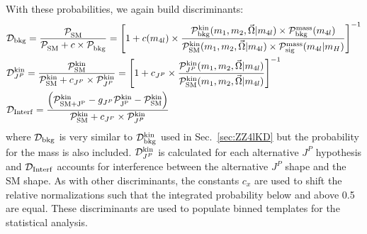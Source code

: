 With these probabilities, we again build discriminants:
\begin{align}
& {\mathcal{D}}_{\rm bkg} = \frac{{\mathcal{P}}^{\rm }_{\rm SM} }{{\mathcal{P}}^{\rm }_{\rm SM} +c\times{\mathcal{P}}^{\rm }_{\rm bkg} }=
\left[1+c(m_{4l})\times\frac{{\mathcal{P}}^{\rm kin}_{\rm bkg} (m_1, m_2, \vec\Omega | m_{4l})\times {\mathcal{P}}^{\rm mass}_{\rm bkg} (m_{4l})  }
{{\mathcal{P}}^{\rm kin}_{\rm SM} (m_1, m_2, \vec\Omega | m_{4l}) \times {\mathcal{P}}^{\rm mass}_{\rm sig} (m_{4l}|m_H) } \right]^{-1} \nonumber \\
& {\mathcal{D}}^{\rm kin}_{J^P} = \frac{{\mathcal{P}}^{\rm kin}_{\rm SM} }{{\mathcal{P}}^{\rm kin}_{\rm SM} +c_{J^P}\times{\mathcal{P}}^{\rm kin}_{J^P} }=
\left[1+c_{J^P}\times\frac{{\mathcal{P}}^{\rm kin}_{J^P} (m_1, m_2, \vec\Omega | m_{4l}) }
{{\mathcal{P}}^{\rm kin}_{\rm SM} (m_1, m_2, \vec\Omega | m_{4l}) } \right]^{-1} \nonumber \\
& {\mathcal{D}}_{\rm Interf} = \frac{ \left({\mathcal{P}}^{\rm kin}_{\rm SM + J^P} - g_{J^P}{\mathcal{P}}^{\rm kin}_{\rm J^P} - {\mathcal{P}}^{\rm kin}_{\rm SM}\right)}{{\mathcal{P}}^{\rm kin}_{\rm SM} +c_{J^P}\times{\mathcal{P}}^{\rm kin}_{J^P} } \nonumber
\end{align}
where ${\mathcal{D}}_{\rm bkg}$ is very similar to ${\mathcal{D}}_{\rm bkg}^{\rm kin}$ used in Sec.~\ref{sec:ZZ4lKD} but the probability for the mass is also included. ${\mathcal{D}}^{\rm kin}_{J^P}$ is calculated for each alternative $J^P$ hypothesis and ${\mathcal{D}}_{\rm Interf}$ accounts for interference between the alternative $J^P$ shape and the SM shape. As with other discriminants, the constants $c_x$ are used to shift the relative normalizations such that the integrated probability below and above 0.5 are equal. These discriminants are used to populate binned templates for the statistical analysis.

